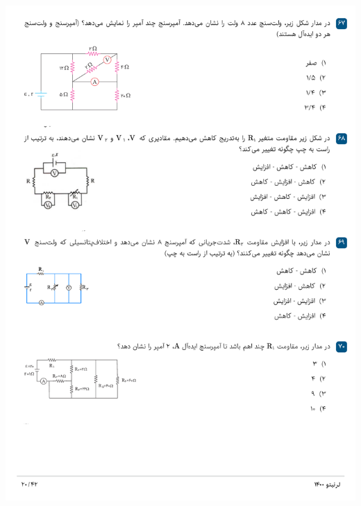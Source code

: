 \documentclass{book}
\begin{document}
\includegraphics[width=\textwidth]{"pages/20"}
\end{document}

